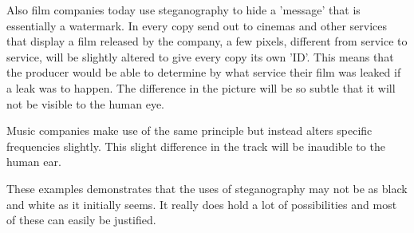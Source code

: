 Also film companies today use steganography to hide a 'message' that is essentially a watermark. In every copy send out to cinemas and other services that display a film released by the company, a few pixels, different from service to service, will be slightly altered to give every copy its own 'ID'.
This means that the producer would be able to determine by what service their film was leaked if a leak was to happen.
The difference in the picture will be so subtle that it will not be visible to the human eye.

Music companies make use of the same principle but instead alters specific frequencies slightly. This slight difference in the track will be inaudible to the human ear. \cite{Anderson1998}


These examples demonstrates that the uses of steganography may not be as black and white as it initially seems. It really does hold a lot of possibilities and most of these can easily be justified.

